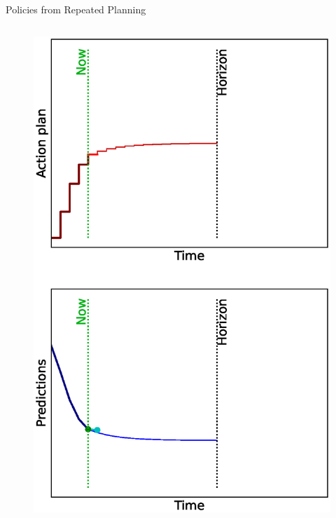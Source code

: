 \documentclass[lecture]{beamer}
\begin{document}
\begin{frame}{\normalsize Policies from Repeated Planning}
\begin{columns}
\begin{overlayarea}{\textwidth}{0.9\textheight}
\begin{figure}
{         \includegraphics[width=\FS\textwidth,clip]{Codes/MPC/MPC4.eps}
        }%
        {%
}
\end{figure}
\end{overlayarea}
\end{columns}
\end{frame}
\end{document}
